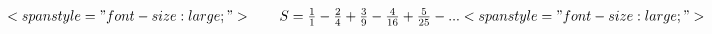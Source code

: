 \documentclass[12pt]{article}
\begin{document}
$ \begin{equation*}<span style="font-size: large;">        S = \frac{1}{1}-\frac{2}{4}+\frac{3}{9}-\frac{4}{16}+\frac{5}{25}-...<span style="font-size: large;">        \end{equation*} $
\end{document}
